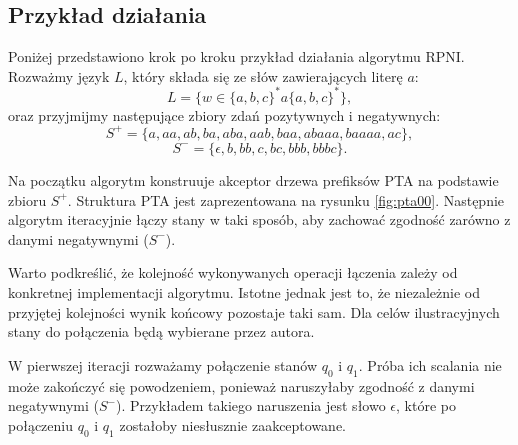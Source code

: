 
\subsection{Przykład działania}

Poniżej przedstawiono krok po kroku przykład działania algorytmu RPNI. Rozważmy język $L$, który składa się ze słów zawierających literę $a$: 
\[
L = \{ w \in \{a, b, c\}^*a\{a, b, c\}^* \},
\]
oraz przyjmijmy następujące zbiory zdań pozytywnych i negatywnych:
\[
S^+ = \{ a, aa, ab, ba, aba, aab, baa, abaaa, baaaa, ac \},
\]
\[
S^- = \{ \epsilon, b, bb, c, bc, bbb, bbbc \}.
\]

Na początku algorytm konstruuje akceptor drzewa prefiksów PTA na podstawie zbioru \( S^+ \). Struktura PTA jest zaprezentowana na rysunku \ref{fig:pta00}. Następnie algorytm iteracyjnie łączy stany w taki sposób, aby zachować zgodność zarówno z danymi negatywnymi (\( S^- \)). 

Warto podkreślić, że kolejność wykonywanych operacji łączenia zależy od konkretnej implementacji algorytmu. Istotne jednak jest to, że niezależnie od przyjętej kolejności wynik końcowy pozostaje taki sam. Dla celów ilustracyjnych stany do połączenia będą wybierane przez autora.

W pierwszej iteracji rozważamy połączenie stanów \( q_0 \) i \( q_1 \). Próba ich scalania nie może zakończyć się powodzeniem, ponieważ naruszyłaby zgodność z danymi negatywnymi (\( S^- \)). Przykładem takiego naruszenia jest słowo \( \epsilon \), które po połączeniu \( q_0 \) i \( q_1 \) zostałoby niesłusznie zaakceptowane. 


